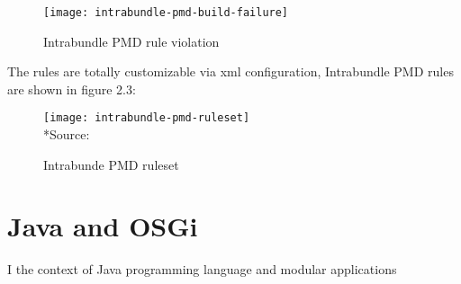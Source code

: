 \begin{figure}[h]
\caption{Intrabundle PMD rule violation}
\centering
\texttt{[image: intrabundle-pmd-build-failure]}
\end{figure}

\FloatBarrier

The rules are totally customizable via xml configuration, Intrabundle PMD rules are shown in figure 2.3:

\begin{figure}[h]
\caption{Intrabunde PMD ruleset}
\centering
\texttt{[image: intrabundle-pmd-ruleset]}
\\*Source: \cite{intrabundle pmd 2014}
\end{figure}

\FloatBarrier

\section{Java and OSGi}
I the context of Java programming language and modular applications 
